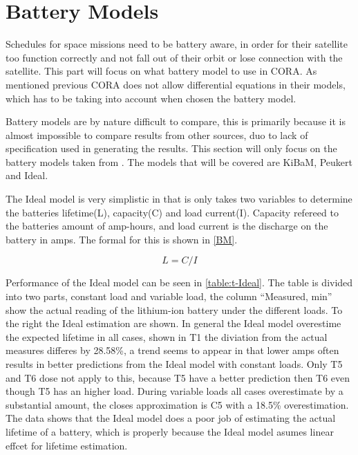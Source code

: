 \section{Battery Models}\label{sec:kibam}
Schedules for space missions need to be battery aware, in order for their satellite too function correctly and not fall out of their orbit or lose connection with the satellite. This part will focus on what battery model to use in CORA. As mentioned previous CORA does not allow differential equations in their models, which has to be taking into account when chosen the battery model.

Battery models are by nature difficult to compare, this is primarily because it is almost impossible to compare results from other sources, duo to lack of specification used in generating the results. This section will only focus on the battery models taken from \cite{battery_model}. The models that will be covered are KiBaM, Peukert and Ideal.

The Ideal model is very simplistic in that is only takes two variables to determine the batteries lifetime(L), capacity(C) and load current(I). Capacity refereed to the batteries amount of amp-hours, and load current is the discharge on the battery in amps. The formal for this is shown in \cref{BM}.

\begin{equation}\label{BM}
L=C/I
\end{equation}

Performance of the Ideal model can be seen in \cref{table:t-Ideal}. The table is divided into two parts, constant load and variable load, the column ``Measured, min'' show the actual reading of the lithium-ion battery under the different loads. To the right the Ideal estimation are shown. In general the Ideal model overestime the expected lifetime in all cases, shown in T1 the diviation from the actual measures differes by 28.58\%, a trend seems to appear in that lower amps often results in better predictions from the Ideal model with constant loads. Only T5 and T6 dose not apply to this, because T5 have a better prediction then T6 even though T5 has an higher load. During variable loads all cases overestimate by a substantial amount, the closes approximation is C5 with a 18.5\% overestimation. The data shows that the Ideal model does a poor job of estimating the actual lifetime of a battery, which is properly because the Ideal model asumes linear effcet for lifetime estimation.

